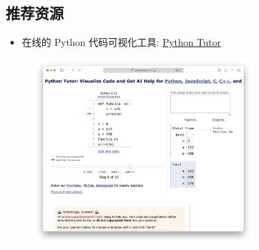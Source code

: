 \documentclass[handout]{ctexbeamer}
\begin{document}
        \subsection{推荐资源}
        \begin{frame}
            \begin{itemize}
                \item 在线的 Python 代码可视化工具: \href{https://pythontutor.com/python-compiler.html}{Python Tutor}
            \end{itemize}
            \begin{figure}
                \centering
                \includegraphics[width=0.75\textwidth]{./images/pythontutor.png}
            \end{figure}
        \end{frame}
        
\end{document}
